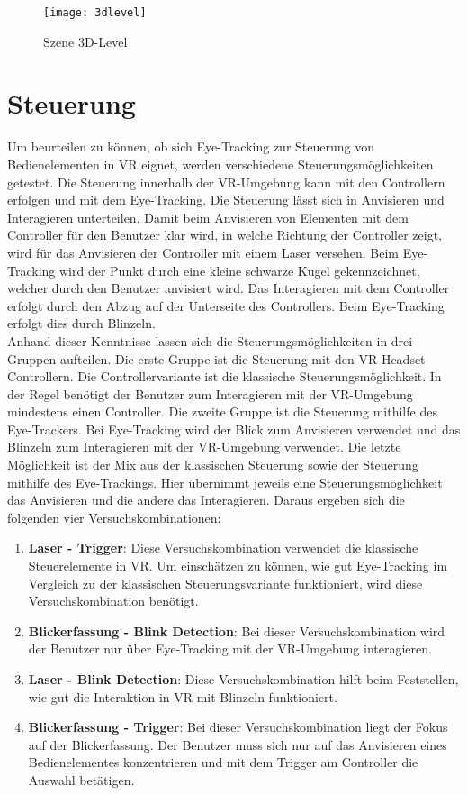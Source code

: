 \begin{figure}[!htbp]
	\centering
	\texttt{[image: 3dlevel]}
	\caption[Szene 3D-Level]{Szene 3D-Level}
	\label{fig:3D-Level}
\end{figure}

\section{Steuerung}
Um beurteilen zu können, ob sich Eye-Tracking zur Steuerung von Bedienelementen in \ac{VR} eignet, werden verschiedene Steuerungsmöglichkeiten getestet. Die Steuerung innerhalb der \ac{VR}-Umgebung kann mit den Controllern erfolgen und mit dem Eye-Tracking. Die Steuerung lässt sich in Anvisieren und Interagieren unterteilen. Damit beim Anvisieren von Elementen mit dem Controller für den Benutzer klar wird, in welche Richtung der Controller zeigt, wird für das Anvisieren der Controller mit einem Laser versehen. Beim Eye-Tracking wird der Punkt durch eine kleine schwarze Kugel gekennzeichnet, welcher durch den Benutzer anvisiert wird. Das Interagieren mit dem Controller erfolgt durch den Abzug auf der Unterseite des Controllers. Beim Eye-Tracking erfolgt dies durch Blinzeln.\\
Anhand dieser Kenntnisse lassen sich die Steuerungsmöglichkeiten in drei Gruppen aufteilen. Die erste Gruppe ist die Steuerung mit den \ac{VR}-Headset Controllern. Die Controllervariante ist die klassische Steuerungsmöglichkeit. In der Regel benötigt der Benutzer zum Interagieren mit der \ac{VR}-Umgebung mindestens einen Controller. Die zweite Gruppe ist die Steuerung mithilfe des Eye-Trackers. Bei Eye-Tracking wird der Blick zum Anvisieren verwendet und das Blinzeln zum Interagieren mit der \ac{VR}-Umgebung verwendet. Die letzte Möglichkeit ist der Mix aus der klassischen Steuerung sowie der Steuerung mithilfe des Eye-Trackings. Hier übernimmt jeweils eine Steuerungsmöglichkeit das Anvisieren und die andere das Interagieren. Daraus ergeben sich die folgenden vier Versuchskombinationen:

\begin{enumerate}
	\item \textbf{Laser - Trigger}: Diese Versuchskombination verwendet die klassische Steuerelemente in \ac{VR}. Um einschätzen zu können, wie gut Eye-Tracking im Vergleich zu der klassischen Steuerungsvariante funktioniert, wird diese Versuchskombination benötigt. 
	\item \textbf{Blickerfassung - Blink Detection}: Bei dieser Versuchskombination wird der Benutzer nur über Eye-Tracking mit der \ac{VR}-Umgebung interagieren. 
	\item \textbf{Laser - Blink Detection}: Diese Versuchskombination hilft beim Feststellen, wie gut die Interaktion in \ac{VR} mit Blinzeln funktioniert. 
	\item \textbf{Blickerfassung - Trigger}: Bei dieser Versuchskombination liegt der Fokus auf der Blickerfassung. Der Benutzer muss sich nur auf das Anvisieren eines Bedienelementes konzentrieren und mit dem Trigger am Controller die Auswahl betätigen.
\end{enumerate}

